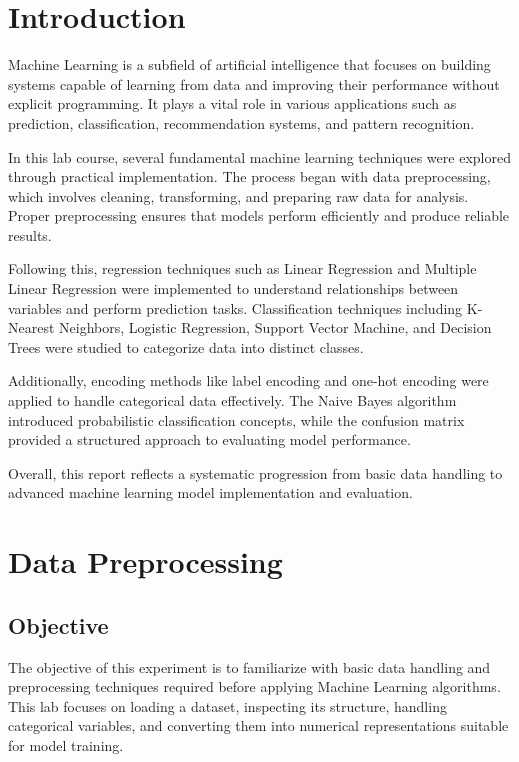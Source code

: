 \documentclass[11pt,a4paper]{report}
\begin{document}
\chapter*{\center Introduction}

Machine Learning is a subfield of artificial intelligence that focuses on building systems capable of learning from data and improving their performance without explicit programming. It plays a vital role in various applications such as prediction, classification, recommendation systems, and pattern recognition.

In this lab course, several fundamental machine learning techniques were explored through practical implementation. The process began with data preprocessing, which involves cleaning, transforming, and preparing raw data for analysis. Proper preprocessing ensures that models perform efficiently and produce reliable results.

Following this, regression techniques such as Linear Regression and Multiple Linear Regression were implemented to understand relationships between variables and perform prediction tasks. Classification techniques including K-Nearest Neighbors, Logistic Regression, Support Vector Machine, and Decision Trees were studied to categorize data into distinct classes.

Additionally, encoding methods like label encoding and one-hot encoding were applied to handle categorical data effectively. The Naive Bayes algorithm introduced probabilistic classification concepts, while the confusion matrix provided a structured approach to evaluating model performance.

Overall, this report reflects a systematic progression from basic data handling to advanced machine learning model implementation and evaluation.



\chapter{Data Preprocessing}


\section*{Objective}
The objective of this experiment is to familiarize with basic data handling and preprocessing techniques required before applying Machine Learning algorithms. This lab focuses on loading a dataset, inspecting its structure, handling categorical variables, and converting them into numerical representations suitable for model training.
\end{document}
